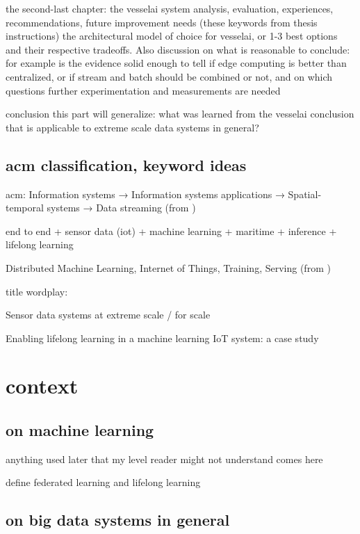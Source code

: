 the second-last chapter:  the vesselai system
analysis, evaluation, experiences, recommendations, future improvement needs (these keywords from thesis instructions)
the architectural model of choice for vesselai, or 1-3 best options and their respective tradeoffs. Also discussion on what is reasonable to conclude: for example is the evidence solid enough to tell if edge computing is better than centralized, or
if stream and batch should be combined or not, and on which questions further experimentation and measurements are needed

conclusion
this part will generalize: what was learned from the vesselai conclusion that is applicable to extreme scale data systems in general?

\section{acm classification,  keyword ideas}

acm:
Information systems → Information systems applications →
Spatial-temporal systems → Data streaming (from \cite{uprctrajectorysystem})

end to end + sensor data (iot) + machine learning + maritime + inference + lifelong learning

Distributed Machine Learning, Internet of Things, Training, Serving (from \cite{mliot})

title wordplay:

Sensor data systems at extreme scale / for scale

Enabling lifelong learning in a machine learning IoT system: a case study

\chapter{context}

\section{on machine learning}

anything used later that my level reader might not understand comes here

define federated learning and lifelong learning

\section{on big data systems in general}

